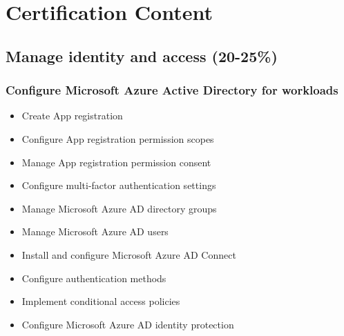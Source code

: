 \section{Certification Content}

\subsection{Manage identity and access (20-25\%)}

\subsubsection{Configure Microsoft Azure Active Directory for workloads}
\begin{itemize}
\item Create App registration 
\item Configure App registration permission scopes 
\item Manage App registration permission consent 
\item Configure multi-factor authentication settings 
\item Manage Microsoft Azure AD directory groups 
\item Manage Microsoft Azure AD users 
\item Install and configure Microsoft Azure AD Connect 
\item Configure authentication methods 
\item Implement conditional access policies 
\item Configure Microsoft Azure AD identity protection 
\end{itemize}

